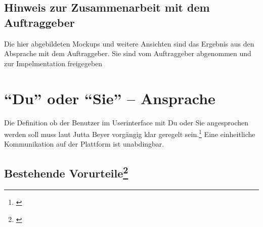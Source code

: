 \subsection{Hinweis zur Zusammenarbeit mit dem
Auftraggeber}\label{hinweis-zur-zusammenarbeit-mit-dem-auftraggeber}

Die hier abgebildeten Mockups und weitere Ansichten sind das Ergebnis
aus den Absprache mit dem Auftraggeber. Sie sind vom Auftraggeber
abgenommen und zur Impelmentation freigegeben

\newpage

\section{\texorpdfstring{``Du'' oder ``Sie'' --
Ansprache}{Du oder Sie -- Ansprache}}\label{du-oder-sie-ansprache}

Die Definition ob der Benutzer im Userinterface mit Du oder Sie
angesprochen werden soll muss laut Jutta Beyer vorgängig klar geregelt
sein.\footnote{\autocite{dusieansprache}} Eine einheitliche
Kommunikation auf der Plattform ist unabdingbar.

\subsection[Bestehende Vorurteile]{\texorpdfstring{Bestehende
Vorurteile\footnote{\autocite{dusieansprache}}}{Bestehende Vorurteile}}\label{bestehende-vorurteiledusieansprache}

